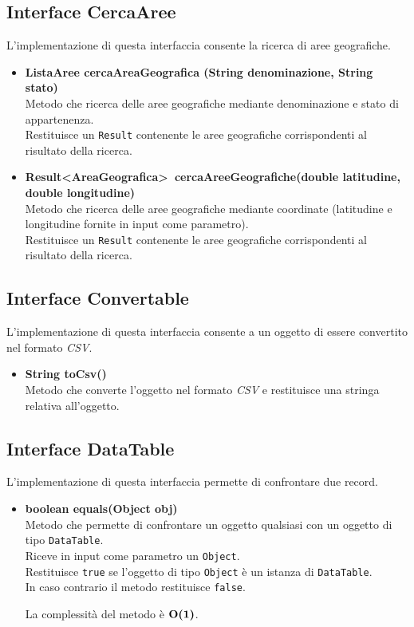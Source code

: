 \documentclass[a4paper, 12pt]{scrreprt}
\begin{document}
			\subsection{Interface CercaAree}
			L'implementazione di questa interfaccia consente la ricerca di aree geografiche.
			\begin{itemize}
				\item \textbf{ListaAree cercaAreaGeografica (String denominazione, String stato)}
				\\Metodo che ricerca delle aree geografiche mediante denominazione e stato di appartenenza.
				\\Restituisce un \verb!Result! contenente le aree geografiche corrispondenti al risultato della ricerca.

				\item\textbf{Result\textless AreaGeografica\textgreater~cercaAreeGeografiche(double latitudine, double longitudine)}
				\\Metodo che ricerca delle aree geografiche mediante coordinate (latitudine e longitudine fornite in input come parametro).
				\\Restituisce un \verb!Result! contenente le aree geografiche corrispondenti al risultato della ricerca.

			\end{itemize}

			\subsection{Interface Convertable}
			L'implementazione di questa interfaccia consente a un oggetto di essere convertito nel formato \textsl{CSV}.
			\begin{itemize}
				\item \textbf{String toCsv()}
				\\Metodo che converte l'oggetto nel formato \textsl{CSV} e restituisce una stringa relativa all'oggetto.

			\end{itemize}
			\subsection{Interface DataTable}
			L'implementazione di questa interfaccia permette di confrontare due record.
			\begin{itemize}
				\item\textbf{boolean equals(Object obj)}
				\\Metodo che permette di confrontare un oggetto qualsiasi con un oggetto di tipo \verb!DataTable!.
				\\Riceve in input come parametro un \verb!Object!.
				\\Restituisce \verb!true! se l'oggetto di tipo \verb!Object! \`e un istanza di \verb!DataTable!.
				\\In caso contrario il metodo restituisce \verb!false!.

				La complessit\`a del metodo \`e $\mathbf{O}\textbf{(1)}$.

			\end{itemize}
\end{document}
